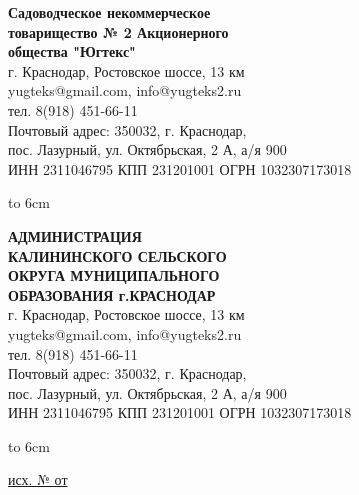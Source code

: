 \noindent\parbox[l][71mm]{80mm}
{
	 \begin{center}
 {\small \textbf{Садоводческое некоммерческое\\ товарищество
 	№  2 Акционерного\\ общества "Югтекс"\\
 }}
 \footnotesize{г. Краснодар, Ростовское шоссе, 13 км\\
 	yugteks@gmail.com, info@yugteks2.ru\\
 	тел. 8(918) 451-66-11\\
 	Почтовый адрес: 350032, г. Краснодар,\\ пос. Лазурный, ул. Октябрьская, 2 А, а/я   900
  }\\
 {ИНН 2311046795 КПП 231201001 ОГРН 1032307173018}
		\end{center}
\hbox to 6cm{ }}\hfill
\parbox[l][71mm]{65mm}
{ \begin{center}
  {\small \textbf{АДМИНИСТРАЦИЯ\\ КАЛИНИНСКОГО
 		СЕЛЬСКОГО\\ ОКРУГА МУНИЦИПАЛЬНОГО\\
 		ОБРАЗОВАНИЯ г.КРАСНОДАР\\
 }}
 \footnotesize{г. Краснодар, Ростовское шоссе, 13 км\\
 	yugteks@gmail.com, info@yugteks2.ru\\
 	тел. 8(918) 451-66-11\\
 	Почтовый адрес: 350032, г. Краснодар,\\ пос. Лазурный, ул. Октябрьская, 2 А, а/я   900
 }\\
 {ИНН 2311046795 КПП 231201001 ОГРН 1032307173018}
\end{center}
\hbox to 6cm{ }}
\linebreak
\vspace{-12mm}

\underline{исх. №  от } 